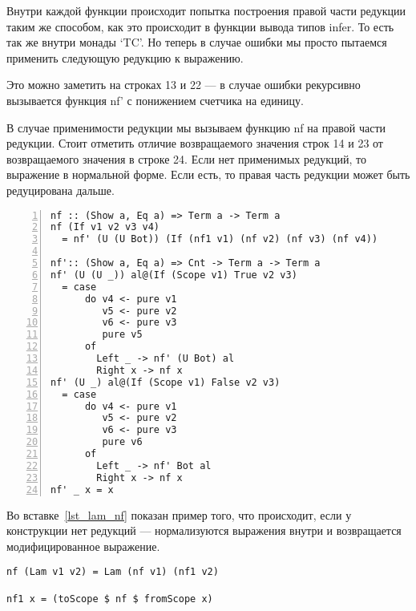 Внутри каждой функции происходит попытка построения правой части редукции таким же способом, как это происходит в функции вывода типов infer. То есть так же внутри монады `TC'. Но теперь в случае ошибки мы просто пытаемся применить следующую редукцию к выражению.

Это можно заметить на строках 13 и 22 --- в случае ошибки рекурсивно вызывается функция nf' с понижением счетчика на единицу.

В случае применимости редукции мы вызываем функцию nf на правой части редукции. Стоит отметить отличие возвращаемого значения строк 14 и 23 от возвращаемого значения в строке 24. Если нет применимых редукций, то выражение в нормальной форме. Если есть, то правая часть редукции может быть редуцирована дальше.

\begin{lstlisting}[caption={Приведение в нормальную форму пытается применить все редукции данного функционального символа},captionpos=b, frame=single, float, floatplacement=H, label={lst_if_nf}, numbers=left]
nf :: (Show a, Eq a) => Term a -> Term a
nf (If v1 v2 v3 v4)
  = nf' (U (U Bot)) (If (nf1 v1) (nf v2) (nf v3) (nf v4))

nf':: (Show a, Eq a) => Cnt -> Term a -> Term a
nf' (U (U _)) al@(If (Scope v1) True v2 v3)
  = case
      do v4 <- pure v1
         v5 <- pure v2
         v6 <- pure v3
         pure v5
      of
        Left _ -> nf' (U Bot) al
        Right x -> nf x
nf' (U _) al@(If (Scope v1) False v2 v3)
  = case
      do v4 <- pure v1
         v5 <- pure v2
         v6 <- pure v3
         pure v6
      of
        Left _ -> nf' Bot al
        Right x -> nf x
nf' _ x = x
\end{lstlisting}

Во вставке~\ref{lst_lam_nf} показан пример того, что происходит, если  у конструкции нет редукций --- нормализуются выражения внутри и возвращается модифицированное выражение.

\begin{lstlisting}[caption={Приведение в нормальную форму конструкции, у которой нет редукций}, captionpos=b, frame=single, float, floatplacement=H, label={lst_lam_nf}]
nf (Lam v1 v2) = Lam (nf v1) (nf1 v2)

nf1 x = (toScope $ nf $ fromScope x)
\end{lstlisting}
